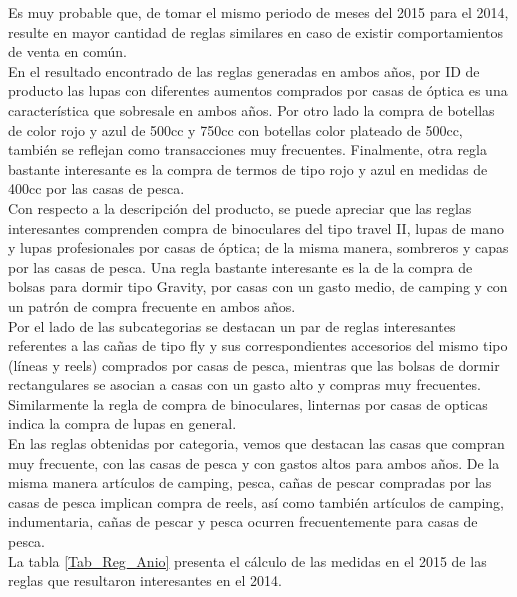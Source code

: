 \documentclass[]{article}
\begin{document}
	Es muy probable que, de tomar el mismo periodo de meses del 2015 para el 2014, resulte en mayor cantidad de reglas similares en caso de existir comportamientos de venta en común.\\
	
	En el resultado encontrado de las reglas generadas en ambos años, por ID de producto las lupas con diferentes aumentos comprados por casas de óptica es una característica que sobresale en ambos años. Por otro lado la compra de botellas de color rojo y azul de 500cc y 750cc con botellas color plateado de 500cc, también se reflejan como transacciones muy frecuentes. Finalmente, otra regla bastante interesante es la compra de termos de tipo rojo y azul en medidas de 400cc por las casas de pesca.\\
	
	Con respecto a la descripción del producto, se puede apreciar que las reglas interesantes comprenden compra de binoculares del tipo travel II, lupas de mano y lupas profesionales por casas de óptica; de la misma manera, sombreros y capas por las casas de pesca. Una regla bastante interesante es la de la compra de bolsas para dormir tipo Gravity, por casas con un gasto medio, de camping y con un patrón de compra frecuente en ambos años.\\
	
	Por el lado de las subcategorias se destacan un par de reglas interesantes referentes a las cañas de tipo fly y sus correspondientes accesorios del mismo tipo (líneas y reels) comprados por casas de pesca, mientras que las bolsas de dormir rectangulares se asocian a casas con un gasto alto y compras muy frecuentes. Similarmente la regla de compra de binoculares, linternas por casas de opticas indica la compra de lupas en general.\\
	
	En las reglas obtenidas por categoria, vemos que destacan las casas que compran muy frecuente, con las casas de pesca y con gastos altos para ambos años. De la misma manera artículos de camping, pesca, cañas de pescar compradas por las casas de pesca implican compra de reels, así como también artículos de camping, indumentaria, cañas de pescar y pesca ocurren frecuentemente para casas de pesca.\\
	
	La tabla \ref{Tab_Reg_Anio} presenta el cálculo de las medidas en el 2015 de las reglas que resultaron interesantes en el 2014.
	
\end{document}
